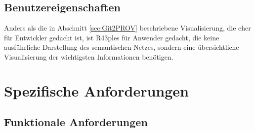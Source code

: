 \documentclass[nocolor]{tudbook}
\begin{document}
\subsection{Benutzereigenschaften}
Anders als die in Abschnitt \ref{sec:Git2PROV} beschriebene Visualisierung, die eher für Entwickler gedacht ist, ist R43ples für Anwender gedacht, die keine ausführliche Darstellung des semantischen Netzes, sondern eine übersichtliche Visualisierung der wichtigsten Informationen benötigen. 

\section{Spezifische Anforderungen}
\subsection{Funktionale Anforderungen}
\end{document}
